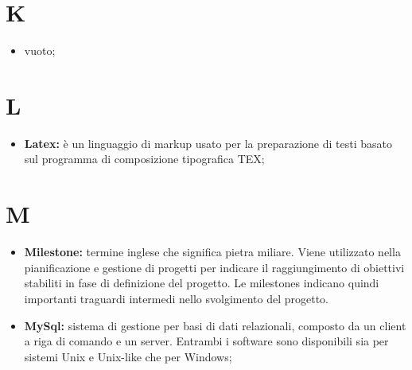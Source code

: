 %


\section*{K} %
\label{sec:k}
	\begin{itemize}
		\item vuoto;
	\end{itemize}
\pagebreak

\section*{L} %
\label{sec:l}
	\begin{itemize}
		\item \textbf{Latex:} è un linguaggio di markup usato per la preparazione di testi basato sul programma di composizione tipografica TEX;
	\end{itemize}
\pagebreak

\section*{M} %
\label{sec:m}
	\begin{itemize}
		\item \textbf{Milestone:} termine inglese che significa pietra miliare. Viene utilizzato nella pianificazione e gestione di progetti per indicare il raggiungimento di obiettivi stabiliti in fase di definizione del progetto. Le milestones indicano quindi importanti traguardi intermedi nello svolgimento del progetto.		
		\item \textbf{MySql:} sistema di gestione per basi di dati relazionali, composto da un client a riga di comando e un server. Entrambi i software sono disponibili sia per sistemi Unix e Unix-like che per Windows;
	\end{itemize}
\pagebreak

